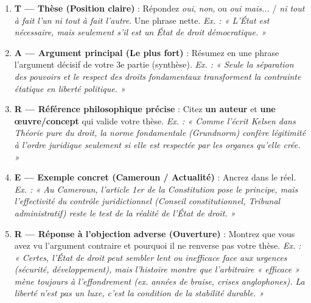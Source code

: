 \documentclass[11pt]{article}
\begin{document}
\begin{methode}
\begin{enumerate}
    \item \textbf{T — Thèse (Position claire)} : Répondez \emph{oui}, \emph{non}, ou \emph{oui mais...} / \emph{ni tout à fait l'un ni tout à fait l'autre}. Une phrase nette. \emph{Ex. : « L'État est nécessaire, mais seulement s'il est un État de droit démocratique. »}
    \item \textbf{A — Argument principal (Le plus fort)} : Résumez en une phrase l'argument décisif de votre 3e partie (synthèse). \emph{Ex. : « Seule la séparation des pouvoirs et le respect des droits fondamentaux transforment la contrainte étatique en liberté politique. »}
    \item \textbf{R — Référence philosophique précise} : Citez \textbf{un auteur} et \textbf{une œuvre/concept} qui valide votre thèse. \emph{Ex. : « Comme l'écrit Kelsen dans \emph{Théorie pure du droit}, la norme fondamentale (Grundnorm) confère légitimité à l'ordre juridique seulement si elle est respectée par les organes qu'elle crée. »}
    \item \textbf{E — Exemple concret (Cameroun / Actualité)} : Ancrez dans le réel. \emph{Ex. : « Au Cameroun, l'article 1er de la Constitution pose le principe, mais l'effectivité du contrôle juridictionnel (Conseil constitutionnel, Tribunal administratif) reste le test de la réalité de l'État de droit. »}
    \item \textbf{R — Réponse à l'objection adverse (Ouverture)} : Montrez que vous avez vu l'argument contraire et pourquoi il ne renverse pas votre thèse. \emph{Ex. : « Certes, l'État de droit peut sembler lent ou inefficace face aux urgences (sécurité, développement), mais l'histoire montre que l'arbitraire « efficace » mène toujours à l'effondrement (ex. années de braise, crises anglophones). La liberté n'est pas un luxe, c'est la condition de la stabilité durable. »}
\end{enumerate}
\end{methode}
\end{document}
